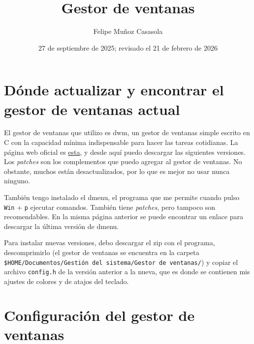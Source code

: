 \documentclass{article}
\title{Gestor de ventanas}
\author{Felipe Muñoz Casasola}
\date{27 de septiembre de 2025; revisado el 21 de febrero de 2026}
\begin{document}
    \maketitle
    \clearpage
    \tableofcontents
    \clearpage
    
    \section{Dónde actualizar y encontrar el gestor de ventanas actual}
    El gestor de ventanas que utilizo es dwm, un gestor de ventanas simple escrito en C con la capacidad mínima indispensable para hacer las tareas cotidianas. La página web oficial es \href{https://dwm.suckless.org/}{esta}, y desde aquí puedo descargar las siguientes versiones. Los \textit{patches} son los complementos que puedo agregar al gestor de ventanas. No obstante, muchos están desactualizados, por lo que es mejor no usar nunca ninguno.

    También tengo instalado el dmenu, el programa que me permite cuando pulso \texttt{Win} + \texttt{p} ejecutar comandos. También tiene \textit{patches}, pero tampoco son recomendables. En la misma página anterior se puede encontrar un enlace para descargar la última versión de dmenu.

    Para instalar nuevas versiones, debo descargar el zip con el programa, descomprimirlo (el gestor de ventanas se encuentra en la carpeta \texttt{\$HOME/Documentos/Gestión del sistema/Gestor de ventanas/}) y copiar el archivo \texttt{config.h} de la versión anterior a la nueva, que es donde se contienen mis ajustes de colores y de atajos del teclado.

    \section{Configuración del gestor de ventanas}
    
\end{document}
